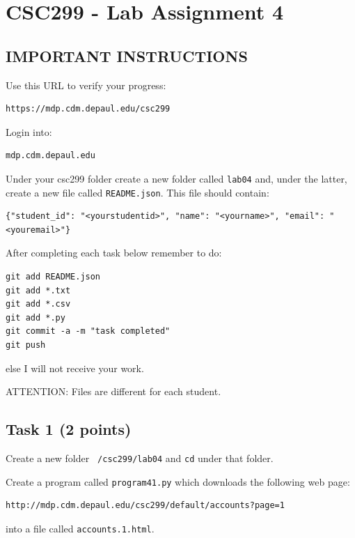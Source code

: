 \documentclass[12pt]{article}
\begin{document}
\section{CSC299 - Lab Assignment 4}

\subsection*{IMPORTANT INSTRUCTIONS}

\noindent Use this URL to verify your progress:
\begin{verbatim}
https://mdp.cdm.depaul.edu/csc299
\end{verbatim}

\noindent Login into:
\begin{verbatim}
mdp.cdm.depaul.edu
\end{verbatim}

\noindent Under your csc299 folder create a new folder called {\tt lab04} and, under the latter, create a new file called {\tt README.json}. This file should contain:

\begin{verbatim}
{"student_id": "<yourstudentid>", "name": "<yourname>", "email": "<youremail>"}
\end{verbatim}

\noindent After completing each task below remember to do:

\begin{verbatim}
git add README.json
git add *.txt
git add *.csv 
git add *.py
git commit -a -m "task completed"
git push
\end{verbatim}

\noindent  else I will not receive your work.

\noindent ATTENTION: Files are different for each student.

\subsection{Task 1 (2 points)}

\noindent  Create a new folder {\tt ~/csc299/lab04} and {\tt cd} under that folder.

\noindent  Create a program called {\tt program41.py} which downloads the following web page:
\begin{verbatim}
http://mdp.cdm.depaul.edu/csc299/default/accounts?page=1
\end{verbatim}

\noindent into a file called {\tt accounts.1.html}.
\end{document}
